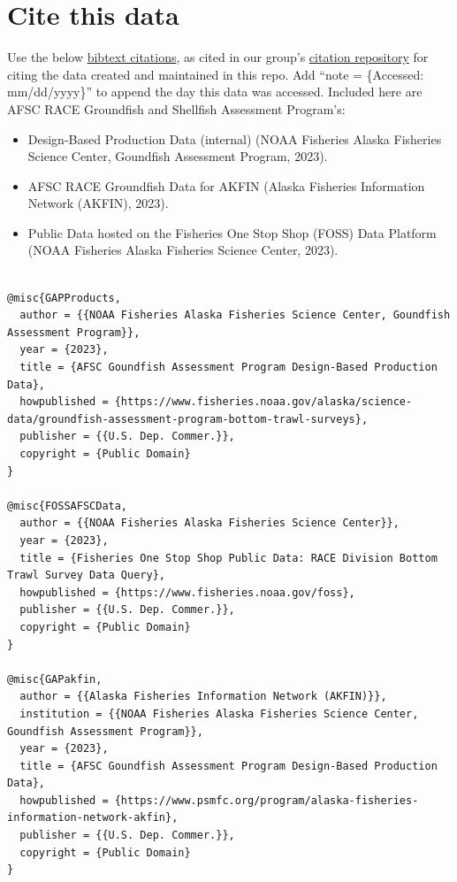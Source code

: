\documentclass[
  letterpaper,
  oneside,
  open=any]{scrbook}
\providecommand{\tightlist}{%
  \setlength{\itemsep}{0pt}\setlength{\parskip}{0pt}}\usepackage{longtable,booktabs,array}
\begin{document}
\hypertarget{cite-this-data}{%
\section*{Cite this data}\label{cite-this-data}}


Use the below
\href{https://github.com/afsc-gap-products/gap_products/blob/main/CITATION.bib}{bibtext
citations}, as cited in our group's
\href{https://github.com/afsc-gap-products/citations/blob/main/cite/bibliography.bib}{citation
repository} for citing the data created and maintained in this repo. Add
``note = \{Accessed: mm/dd/yyyy\}'' to append the day this data was
accessed. Included here are AFSC RACE Groundfish and Shellfish
Assessment Program's:

\begin{itemize}
\tightlist
\item
  Design-Based Production Data (internal) (NOAA Fisheries Alaska
  Fisheries Science Center, Goundfish Assessment Program, 2023).\\
\item
  AFSC RACE Groundfish Data for AKFIN (Alaska Fisheries Information
  Network (AKFIN), 2023).
\item
  Public Data hosted on the Fisheries One Stop Shop (FOSS) Data Platform
  (NOAA Fisheries Alaska Fisheries Science Center, 2023).
\end{itemize}

\begin{verbatim}

@misc{GAPProducts,
  author = {{NOAA Fisheries Alaska Fisheries Science Center, Goundfish Assessment Program}},
  year = {2023}, 
  title = {AFSC Goundfish Assessment Program Design-Based Production Data},
  howpublished = {https://www.fisheries.noaa.gov/alaska/science-data/groundfish-assessment-program-bottom-trawl-surveys},
  publisher = {{U.S. Dep. Commer.}},
  copyright = {Public Domain} 
}

@misc{FOSSAFSCData,
  author = {{NOAA Fisheries Alaska Fisheries Science Center}},
  year = {2023}, 
  title = {Fisheries One Stop Shop Public Data: RACE Division Bottom Trawl Survey Data Query},
  howpublished = {https://www.fisheries.noaa.gov/foss},
  publisher = {{U.S. Dep. Commer.}},
  copyright = {Public Domain} 
}

@misc{GAPakfin,
  author = {{Alaska Fisheries Information Network (AKFIN)}}, 
  institution = {{NOAA Fisheries Alaska Fisheries Science Center, Goundfish Assessment Program}},
  year = {2023}, 
  title = {AFSC Goundfish Assessment Program Design-Based Production Data},
  howpublished = {https://www.psmfc.org/program/alaska-fisheries-information-network-akfin},
  publisher = {{U.S. Dep. Commer.}},
  copyright = {Public Domain} 
}
\end{verbatim}
\end{document}
